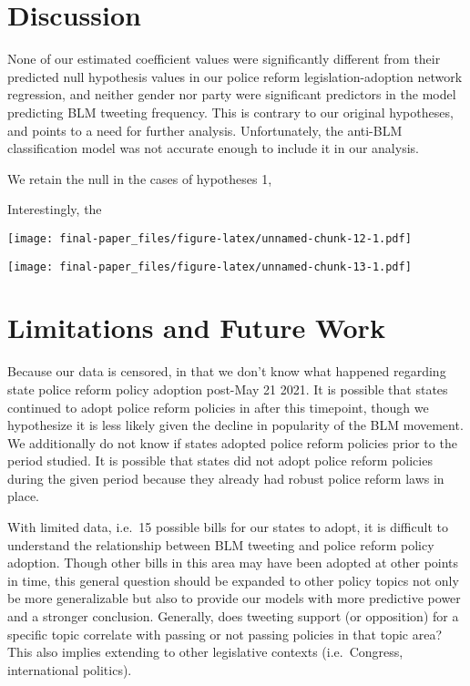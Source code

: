 \documentclass[12pt]{article}
\begin{document}
\hypertarget{discussion}{%
\section{Discussion}\label{discussion}}

None of our estimated coefficient values were significantly different
from their predicted null hypothesis values in our police reform
legislation-adoption network regression, and neither gender nor party
were significant predictors in the model predicting BLM tweeting
frequency. This is contrary to our original hypotheses, and points to a
need for further analysis. Unfortunately, the anti-BLM classification
model was not accurate enough to include it in our analysis.

We retain the null in the cases of hypotheses 1,

Interestingly, the

\texttt{[image: final-paper\_files/figure-latex/unnamed-chunk-12-1.pdf]}

\texttt{[image: final-paper\_files/figure-latex/unnamed-chunk-13-1.pdf]}

\hypertarget{limitations-and-future-work}{%
\section{Limitations and Future
Work}\label{limitations-and-future-work}}

Because our data is censored, in that we don't know what happened
regarding state police reform policy adoption post-May 21 2021. It is
possible that states continued to adopt police reform policies in after
this timepoint, though we hypothesize it is less likely given the
decline in popularity of the BLM movement. We additionally do not know
if states adopted police reform policies prior to the period studied. It
is possible that states did not adopt police reform policies during the
given period because they already had robust police reform laws in
place.

With limited data, i.e.~15 possible bills for our states to adopt, it is
difficult to understand the relationship between BLM tweeting and police
reform policy adoption. Though other bills in this area may have been
adopted at other points in time, this general question should be
expanded to other policy topics not only be more generalizable but also
to provide our models with more predictive power and a stronger
conclusion. Generally, does tweeting support (or opposition) for a
specific topic correlate with passing or not passing policies in that
topic area? This also implies extending to other legislative contexts
(i.e.~Congress, international politics).
\end{document}
